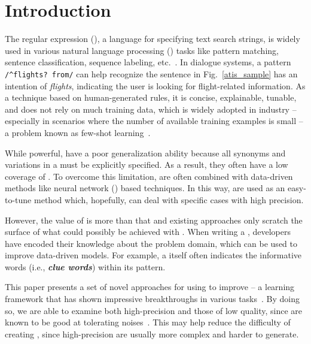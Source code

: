 \section{Introduction}


The regular expression (\RE), a language for specifying text search strings, is widely used in various natural language processing (\NLP)
tasks like pattern matching, sentence classification, sequence labeling, etc.~\cite{chang2014tokensregex}. In dialogue systems, a \RE
pattern \texttt{/\textasciicircum flights? from/} can help recognize the sentence in Fig.~\ref{atis_sample} has an intention of
\emph{flights}, indicating the user is looking for flight-related information. As a technique based on human-generated rules, it is
concise, explainable, tunable, and does not rely on much training data, which is widely adopted in industry -- especially in scenarios
where the number of available training examples is small -- a problem known as few-shot learning~\cite{gc2015big}.

While powerful, \REs have a poor generalization ability because all synonyms and variations in a \RE must be explicitly specified. As a
result, they often have a low coverage of . To overcome this limitation, \REs are often combined with data-driven methods like neural
network (\NN) based techniques. In this way, \REs are used as an easy-to-tune method which, hopefully, can deal with specific cases with
high precision.

However, the value of \REs is more than that and existing approaches only scratch the surface of what could possibly be achieved with \REs.
When writing a \RE, developers have encoded their knowledge about the problem domain, which can be used to improve data-driven models. For
example, a \RE itself often indicates the informative words (i.e., \textbf{\textit{clue words}}) within its pattern.

This paper presents a set of novel approaches for using \REs to improve \NNs -- a learning framework that has shown impressive
breakthroughs in various \NLP tasks~\cite{goldberg2017neural}. By doing so, we are able to examine both high-precision \REs and those of
low quality, since \NNs are known to be good at tolerating noises~\cite{xie2016disturblabel}. This may help reduce the difficulty of
creating \REs, since high-precision \REs are usually more complex and harder to generate.


